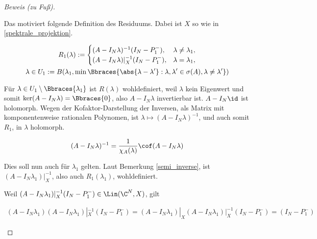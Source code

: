 \begin{proof}[Beweis (zu Fuß)]
\begin{enumerate}[label = (\roman*)]
        Das motiviert folgende Definition des Residuums.
        Dabei ist $X$ so wie in \ref{spektrale_projektion}.

        \begin{multline*}
            R_1(\lambda)
            :=
            \begin{cases}
                (A - I_N \lambda)    ^{-1} (I_N - P_1^-), & \lambda \neq \lambda_1, \\
                (A - I_N \lambda) |_X^{-1} (I_N - P_1^-), & \lambda =    \lambda_1, \\
            \end{cases} \\
            \lambda
            \in
            U_1
            :=
            B
            (
                \lambda_1,
                \min
                \Bbraces
                {
                    \abs{\lambda - \lambda^\prime}:
                    \lambda, \lambda^\prime \in \sigma(A),
                    \lambda \neq \lambda^\prime
                }
            )
        \end{multline*}

        Für $\lambda \in U_1 \setminus \Bbraces{\lambda_1}$ ist $R(\lambda)$ wohldefiniert, weil $\lambda$ kein Eigenwert und somit $\ker (A - I_N \lambda) = \Bbraces{0}$, also $A - I_N \lambda$ invertierbar ist.
        $A - I_N \id$ ist holomorph.
        Wegen der Kofaktor-Darstellung der Inversen, als Matrix mit komponentenweise rationalen Polynomen, ist $\lambda \mapsto (A - I_N \lambda)^{-1}$, und auch somit $R_1$, in $\lambda$ holomorph.

        \begin{align*}
            (A - I_N \lambda)^{-1}
            =
            \frac{1}{\chi_A(\lambda)}
            \cof (A - I_N \lambda)
        \end{align*}

        Dies soll nun auch für $\lambda_1$ gelten.
        Laut Bemerkung \ref{semi_inverse}, ist $(A - I_N \lambda_1) |_X^{-1}$, also auch $R_1(\lambda_1)$, wohldefiniert.

        Weil $(A - I_N \lambda_1) |_X^{-1} (I_N - P_1^-) \in \Lin(\C^N, X)$, gilt

        \begin{align*}
            (A - I_N \lambda_1)
            (A - I_N \lambda_1) |_X^{-1}
            (I_N - P_1^-)
            =
            (A - I_N \lambda_1) |_X
            (A - I_N \lambda_1) |_X^{-1}
            (I_N - P_1^-)
            =
            (I_N - P_1^-)
        \end{align*}


\end{enumerate}
\end{proof}
